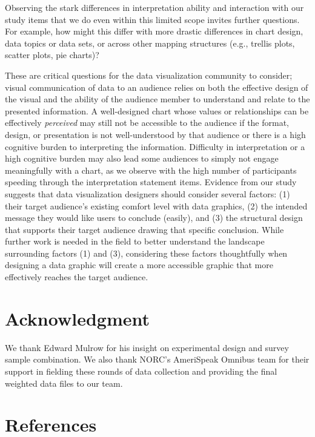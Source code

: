 \documentclass{IEEEcsmag}
\begin{document}
Observing the stark differences in interpretation ability and interaction with our study items that we do even within this limited scope invites further questions. For example, how might this differ with more drastic differences in chart design, data topics or data sets, or across other mapping structures (e.g., trellis plots, scatter plots, pie charts)?

These are critical questions for the data visualization community to consider; visual communication of data to an audience relies on both the effective design of the visual and the ability of the audience member to understand and relate to the presented information. A well-designed chart whose values or relationships can be effectively \emph{perceived} may still not be accessible to the audience if the format, design, or presentation is not well-understood by that audience or there is a high cognitive burden to interpreting the information. Difficulty in interpretation or a high cognitive burden may also lead some audiences to simply not engage meaningfully with a chart, as we observe with the high number of participants speeding through the interpretation statement items. Evidence from our study suggests that data visualization designers should consider several factors: (1) their target audience's existing comfort level with data graphics, (2) the intended message they would like users to conclude (easily), and (3) the structural design that supports their target audience drawing that specific conclusion. While further work is needed in the field to better understand the landscape surrounding factors (1) and (3), considering these factors thoughtfully when designing a data graphic will create a more accessible graphic that more effectively reaches the target audience.

\section{Acknowledgment}\label{acknowledgment}

We thank Edward Mulrow for his insight on experimental design and survey sample combination. We also thank NORC's AmeriSpeak Omnibus team for their support in fielding these rounds of data collection and providing the final weighted data files to our team.

\section*{References}\label{references}
\end{document}
